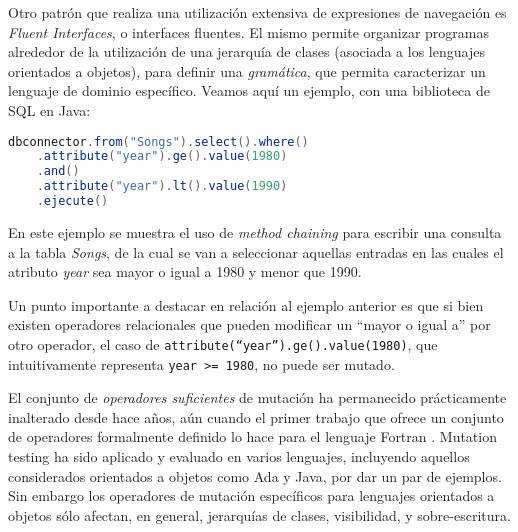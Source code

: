 Otro patr\'on que realiza una utilizaci\'on extensiva de expresiones de navegaci\'on es \emph{Fluent Interfaces}, o interfaces fluentes. El mismo permite organizar programas alrededor de la utilizaci\'on de una jerarqu\'ia de clases (asociada a los lenguajes orientados a objetos), para definir una \emph{gram\'atica}, que permita caracterizar un lenguaje de dominio espec\'ifico. Veamos aqu\'i un ejemplo, con una biblioteca de SQL en Java:
\begin{center}
	\begin{lstlisting}[mathescape=true, language=Java]
	dbconnector.from("Songs").select().where()
	.attribute("year").ge().value(1980)
	.and()
	.attribute("year").lt().value(1990)
	.ejecute()
	\end{lstlisting}
\end{center}
En este ejemplo se muestra el uso de \emph{method chaining} para escribir una consulta a la tabla \emph{Songs}, de la cual se van a seleccionar aquellas entradas en las cuales el atributo \emph{year} sea mayor o igual a 1980 y menor que 1990.

Un punto importante a destacar en relaci\'on al ejemplo anterior es que si bien existen operadores relacionales que pueden modificar un ``mayor o igual a'' por otro operador, el caso de \texttt{attribute(``year'').ge().value(1980)}, que intuitivamente representa \texttt{year >= 1980}, no puede ser mutado.

El conjunto de \emph{operadores suficientes} de mutaci\'on ha permanecido pr\'acticamente inalterado desde hace a\~nos, a\'un cuando el primer trabajo que ofrece un conjunto de operadores formalmente definido lo hace para el lenguaje Fortran \cite{bibliography.mutation.definitions.fortranOffut87, bibliography.mutation.definitions.fortranKing91}. Mutation testing ha sido aplicado y evaluado en varios lenguajes, incluyendo aquellos considerados orientados a objetos como Ada y Java, por dar un par de ejemplos. Sin embargo los operadores de mutaci\'on espec\'ificos para lenguajes orientados a objetos s\'olo afectan, en general, jerarqu\'ias de clases, visibilidad, y sobre-escritura. 

